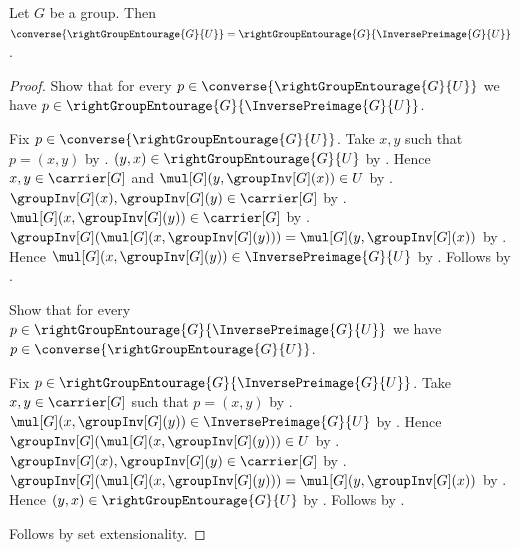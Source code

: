 \begin{proposition}\label{right_group_entourage_converse}
    Let $G$ be a group.
    Then $\converse{\rightGroupEntourage{G}{U}}
        =\rightGroupEntourage{G}{\InversePreimage{G}{U}}$.
\end{proposition}
\begin{proof}
    Show that for every
        $p\in\converse{\rightGroupEntourage{G}{U}}$ we have
        $p\in\rightGroupEntourage{G}{\InversePreimage{G}{U}}$.
    \begin{subproof}
        Fix $p\in\converse{\rightGroupEntourage{G}{U}}$.
        Take $x,y$ such that $p=(x,y)$
            by .
        $(y,x)\in\rightGroupEntourage{G}{U}$
            by .
        Hence $x,y\in\carrier[G]$ and
            $\mul[G](y,\groupInv[G](x))\in U$
            by .
        $\groupInv[G](x),\groupInv[G](y)\in\carrier[G]$
            by .
        $\mul[G](x,\groupInv[G](y))\in\carrier[G]$
            by .
        $\groupInv[G](\mul[G](x,\groupInv[G](y)))
            =\mul[G](y,\groupInv[G](x))$
            by .
        Hence $\mul[G](x,\groupInv[G](y))
            \in\InversePreimage{G}{U}$ by .
        Follows by .
    \end{subproof}
    Show that for every
        $p\in\rightGroupEntourage{G}{\InversePreimage{G}{U}}$ we have
        $p\in\converse{\rightGroupEntourage{G}{U}}$.
    \begin{subproof}
        Fix $p\in\rightGroupEntourage{G}{\InversePreimage{G}{U}}$.
        Take $x,y\in\carrier[G]$ such that $p=(x,y)$
            by .
        $\mul[G](x,\groupInv[G](y))
            \in\InversePreimage{G}{U}$
            by .
        Hence
            $\groupInv[G](\mul[G](x,\groupInv[G](y)))\in U$
            by .
        $\groupInv[G](x),\groupInv[G](y)\in\carrier[G]$
            by .
        $\groupInv[G](\mul[G](x,\groupInv[G](y)))
            =\mul[G](y,\groupInv[G](x))$
            by .
        Hence $(y,x)\in\rightGroupEntourage{G}{U}$
            by .
        Follows by .
    \end{subproof}
    Follows by set extensionality.
\end{proof}

